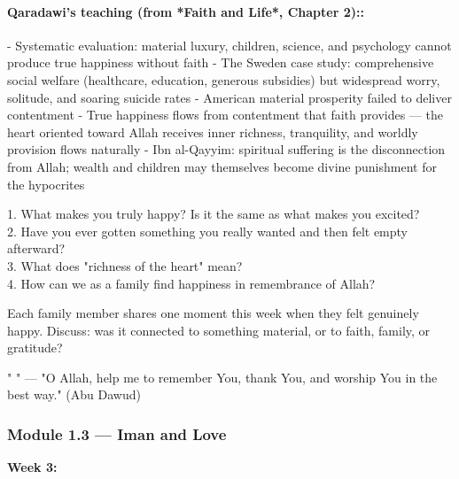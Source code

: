 \documentclass[11pt,a4paper]{article}
\begin{document}
\paragraph*{Qaradawi's teaching (from *Faith and Life*, Chapter 2)::}  - Systematic evaluation: material luxury, children, science, and psychology cannot produce true happiness without faith - The Sweden case study: comprehensive social welfare (healthcare, education, generous subsidies) but widespread worry, solitude, and soaring suicide rates - American material prosperity failed to deliver contentment - True happiness flows from contentment that faith provides --- the heart oriented toward Allah receives inner richness, tranquility, and worldly provision flows naturally - Ibn al-Qayyim: spiritual suffering is the disconnection from Allah; wealth and children may themselves become divine punishment for the hypocrites

\begin{discussionbox} 1. What makes you truly happy? Is it the same as what makes you excited? \\ 2. Have you ever gotten something you really wanted and then felt empty afterward? \\ 3. What does "richness of the heart" mean? \\ 4. How can we as a family find happiness in remembrance of Allah? \end{discussionbox}

\begin{activitybox} Each family member shares one moment this week when they felt genuinely happy. Discuss: was it connected to something material, or to faith, family, or gratitude? \end{activitybox}

\begin{duabox} "      " --- "O Allah, help me to remember You, thank You, and worship You in the best way." (Abu Dawud) \end{duabox}

\vspace{6pt}\noindent{\color{border}\rule{\textwidth}{0.5pt}}\vspace{6pt}

\subsubsection*{Module 1.3 --- Iman and Love}
\textbf{Week 3:} 
\end{document}
